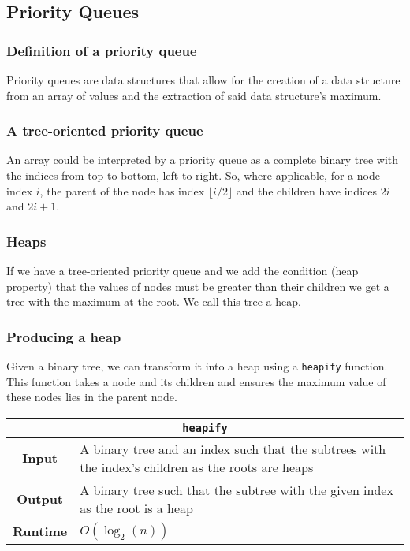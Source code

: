 \documentclass[a4paper, 12pt, twoside]{article}
\begin{document}
\subsection{Priority Queues}

\subsubsection{Definition of a priority queue}

Priority queues are data structures that allow for the creation
of a data structure from an array of values and the extraction 
of said data structure's maximum.

\subsubsection{A tree-oriented priority queue}

An array could be interpreted by a priority queue as a complete 
binary tree with the indices from top to bottom, left to right. 
So, where applicable, for a node index $i$, the parent of the 
node has index $\lfloor i / 2 \rfloor$ and the children have 
indices $2i$ and $2i + 1$.

\subsubsection{Heaps}

If we have a tree-oriented priority queue and we add the condition
(heap property) that the values of nodes must be greater than
their children we get a tree with the maximum at the root. We
call this tree a heap.

\subsubsection{Producing a heap}

Given a binary tree, we can transform it into a heap using a
\texttt{heapify} function. This function takes a node and its children
and ensures the maximum value of these nodes lies in the parent node.

\begin{center}
      \begin{tabular}{ || c | p{8.5cm} || }
                  \multicolumn{2}{c}{\texttt{heapify}} \\
            \hline
                  \textbf{Input} & A binary tree and an index
                  such that the subtrees with the index's children
                  as the roots are heaps \\
                  \textbf{Output} & A binary tree such that
                  the subtree with the given index as the root
                  is a heap \\
            \hline\hline
                  \textbf{Runtime} & $O(\log_2(n))$ \\
            \hline
      \end{tabular}
\end{center}
\end{document}
